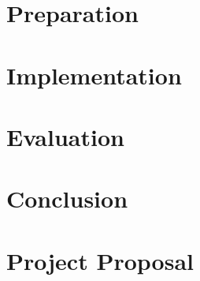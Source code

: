\documentclass[12pt,a4paper,twoside,openany]{report}
\begin{document}
    \chapter{Preparation}\label{ch:preparation}
    


    \chapter{Implementation}\label{ch:implementation}
    


    \chapter{Evaluation}\label{ch:evaluation}
    


    \chapter{Conclusion}\label{ch:conclusion}
    

%    


    \printbibliography[heading=bibintoc]

    \appendix


    \chapter{Project Proposal}\label{ch:proposal}
    
\end{document}
